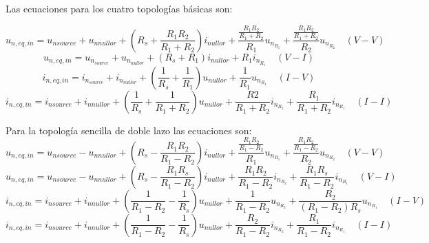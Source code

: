 \documentclass[10pt]{book}
\begin{document}
Las ecuaciones para los cuatro topolog\'ias b\'asicas son:

\begin{displaymath}
u_{n,eq,in}=u_{nsource}+u_{nnullor}+(R_s+\frac{R_1R_2}{R_1+R_2})i_{nullor}+\frac{\frac{R_1R_2}{R_1+R_2}}{R_1}u_{n_{R_1}}+\frac{\frac{R_1R_2}{R_1+R_2}}{R_2}u_{n_{R_2}}\quad(V-V)
\end{displaymath}
\begin{displaymath}
u_{n,eq,in}=u_{n_{source}}+u_{n_{nullor}}+(R_s+R_1)i_{nullor}+R_1i_{n_{R_1}}\quad(V-I)
\end{displaymath}
\begin{displaymath}
i_{n,eq,in}=i_{n_{source}}+i_{n_{nullor}}+(\frac{1}{R_s}+\frac{1}{R_1})u_{nullor}+\frac{1}{R_1}u_{n_{R_1}}\quad(I-V)
\end{displaymath}
\begin{displaymath}
i_{n,eq,in}=i_{nsource}+i_{nnullor}+(\frac{1}{R_s}+\frac{1}{R_1+R_2})u_{nullor}+\frac{R2}{R_1+R_2}i_{n_{R_2}}+\frac{R_1}{R_1+R_2}i_{n_{R_1}}\quad(I-I)
\end{displaymath}

Para la topolog\'ia sencilla de doble lazo las ecuaciones son:
\begin{displaymath}
u_{n,eq,in}=u_{nsource}-u_{nnullor}+(R_s-\frac{R_1R_2}{R_1-R_2})i_{nullor}+\frac{\frac{R_1R_2}{R_1-R_2}}{R_1}u_{n_{R_1}}+\frac{\frac{R_1R_2}{R_1-R_2}}{R_2}u_{n_{R_2}}\quad(V-V)
\end{displaymath}
\begin{displaymath}
u_{n,eq,in}=u_{nsource}-u_{nnullor}+(R_s-\frac{R_1R_s}{R_1-R_2})i_{nullor}+\frac{R_1R_2}{R_1-R_2}i_{n_{R_2}}+\frac{R_1R_s}{R_1-R_2}i_{n_{R_1}}\quad(V-I)
\end{displaymath}
\begin{displaymath}
i_{n,eq,in}=i_{nsource}+i_{nnullor}+(\frac{1}{R_1-R_2}-\frac{1}{R_s})u_{nullor}+\frac{1}{R_1-R_2}u_{n_{R_2}}+\frac{R_2}{(R_1-R_2)R_s}u_{n_{R_1}}\quad(I-V)
\end{displaymath}
\begin{displaymath}
i_{n,eq,in}=i_{nsource}+i_{nnullor}+(\frac{1}{R_1-R_2}-\frac{1}{R_s})u_{nullor}+\frac{R_2}{R_1-R_2}i_{n_{R_2}}+\frac{R_1}{R_1-R_2}i_{n_{R_1}}\quad(I-I)
\end{displaymath}
\end{document}
